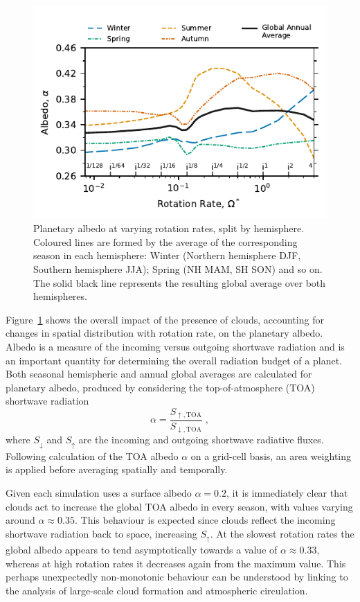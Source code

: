 \begin{figure}[tb]
    \centering
    \includegraphics[width=1.0\columnwidth]{plots/4-albedo_seasonal_variation-small.pdf}
    \caption{Planetary albedo at varying rotation rates, split by hemisphere. Coloured lines are formed by the average of the corresponding season in each hemisphere: Winter (Northern hemisphere DJF, Southern hemisphere JJA); Spring (NH MAM, SH SON) and so on. The solid black line represents the resulting global average over both hemispheres.}
    \label{fig:albedo_seasonal_variation}
\end{figure}

Figure~\ref{fig:albedo_seasonal_variation} shows the overall impact of the presence of clouds, accounting for changes in spatial distribution with rotation rate, on the planetary albedo. Albedo is a measure of the incoming versus outgoing shortwave radiation and is an important quantity for determining the overall radiation budget of a planet. Both seasonal hemispheric and annual global averages are calculated for planetary albedo, produced by considering the top-of-atmosphere (TOA) shortwave radiation
\begin{equation}
    \alpha = \frac{S_{\uparrow,\textrm{TOA}}}{S_{\downarrow,\textrm{TOA}}}\;,
\end{equation}
where $S_\downarrow$ and $S_\uparrow$ are the incoming and outgoing shortwave radiative fluxes. Following calculation of the TOA albedo $\alpha$ on a grid-cell basis, an area weighting is applied before  averaging spatially and temporally. 

Given each simulation uses a surface albedo $\alpha=0.2$, it is immediately clear that clouds act to increase the global TOA albedo in every season, with values varying around $\alpha \approx 0.35$. This behaviour is expected since clouds reflect the incoming shortwave radiation back to space, increasing $S_\uparrow$. At the slowest rotation rates the global albedo appears to tend asymptotically towards a value of $\alpha \approx 0.33$, whereas at high rotation rates it decreases again from the maximum value. This perhaps unexpectedly non-monotonic behaviour can be understood by linking to the analysis of large-scale cloud formation and atmospheric circulation.

